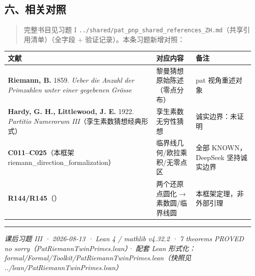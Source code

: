 \documentclass[
]{article}
\newcounter{none} %
\begin{document}
\subsection{六、相关对照}\label{ux516dux76f8ux5173ux5bf9ux7167}

\begin{quote}
完整书目见习题 I
\texttt{../shared/pat\_pnp\_shared\_references\_ZH.md}（共享引用清单）（全字段
+ 验证记录）。本条习题新增对照：
\end{quote}

{\def\LTcaptype{none} %
\begin{longtable}[]{@{}
 >{\raggedright\arraybackslash}p{}
 >{\raggedright\arraybackslash}p{}
 >{\raggedright\arraybackslash}p{}@{}}
\toprule\noalign{}
\begin{minipage}[b]{\linewidth}\raggedright
文献
\end{minipage} & \begin{minipage}[b]{\linewidth}\raggedright
对应内容
\end{minipage} & \begin{minipage}[b]{\linewidth}\raggedright
备注
\end{minipage} \\
\midrule\noalign{}
\endhead
\bottomrule\noalign{}
\endlastfoot
\textbf{Riemann, B.} 1859. \emph{Ueber die Anzahl der Primzahlen unter
einer gegebenen Grösse} & 黎曼猜想原始陈述（零点分布） & pat
视角重述对象 \\
\textbf{Hardy, G. H., Littlewood, J. E.} 1922. \emph{Partitio Numerorum
III}（孪生素数猜想经典形式） & 孪生素数无穷性猜想 & 诚实边界：未证明 \\
\textbf{C011--C025}（本框架 riemann\_direction\_formalization） &
临界线几何/欧拉乘积/无零点区 & 全部 KNOWN，DeepSeek 坚持诚实边界 \\
\textbf{R144/R145}（） & 两个还原点圆化 → 素数圆/临界线圆 &
本框架定理，非外部引理 \\
\end{longtable}
}

\begin{center}\rule{0.5\linewidth}{0.5pt}\end{center}

\emph{课后习题 III · 2026-08-13 · Lean 4 / mathlib v4.32.2 · 7
theorems PROVED no sorry（PatRiemannTwinPrimes.lean）· 配套 Lean
形式化：formal/Formal/Toolkit/PatRiemannTwinPrimes.lean（快照见
../lean/PatRiemannTwinPrimes.lean）}
\end{document}
